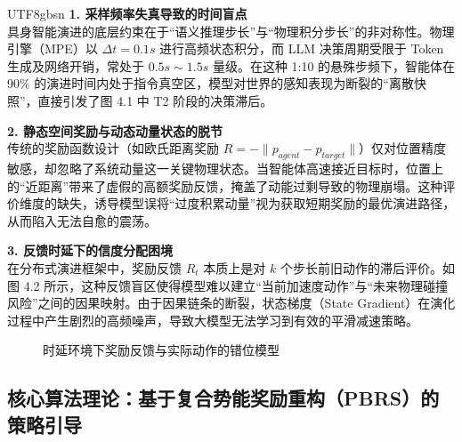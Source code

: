 \documentclass[11pt,a4paper]{article}
\begin{document}
\begin{CJK*}{UTF8}{gbsn}
\noindent \textbf{1. 采样频率失真导致的时间盲点} \\
具身智能演进的底层约束在于“语义推理步长”与“物理积分步长”的非对称性。物理引擎（MPE）以 $\Delta t = 0.1s$ 进行高频状态积分，而 LLM 决策周期受限于 Token 生成及网络开销，常处于 $0.5s \sim 1.5s$ 量级。在这种 1:10 的悬殊步频下，智能体在 90\% 的演进时间内处于指令真空区，模型对世界的感知表现为断裂的“离散快照”，直接引发了图 4.1 中 T2 阶段的决策滞后。

\vspace{1em}
\noindent \textbf{2. 静态空间奖励与动态动量状态的脱节} \\
传统的奖励函数设计（如欧氏距离奖励 $R = -\|p_{agent} - p_{target}\|$）仅对位置精度敏感，却忽略了系统动量这一关键物理状态。当智能体高速接近目标时，位置上的“近距离”带来了虚假的高额奖励反馈，掩盖了动能过剩导致的物理崩塌。这种评价维度的缺失，诱导模型误将“过度积累动量”视为获取短期奖励的最优演进路径，从而陷入无法自愈的震荡。

\vspace{1em}
\noindent \textbf{3. 反馈时延下的信度分配困境} \\
在分布式演进框架中，奖励反馈 $R_t$ 本质上是对 $k$ 个步长前旧动作的滞后评价。如图 4.2 所示，这种反馈盲区使得模型难以建立“当前加速度动作”与“未来物理碰撞风险”之间的因果映射。由于因果链条的断裂，状态梯度（State Gradient）在演化过程中产生剧烈的高频噪声，导致大模型无法学习到有效的平滑减速策略。

\begin{figure}[h!]
\centering
{}
\caption{时延环境下奖励反馈与实际动作的错位模型}
\end{figure}

\subsection{核心算法理论：基于复合势能奖励重构（PBRS）的策略引导}


\end{CJK*}
\end{document}
